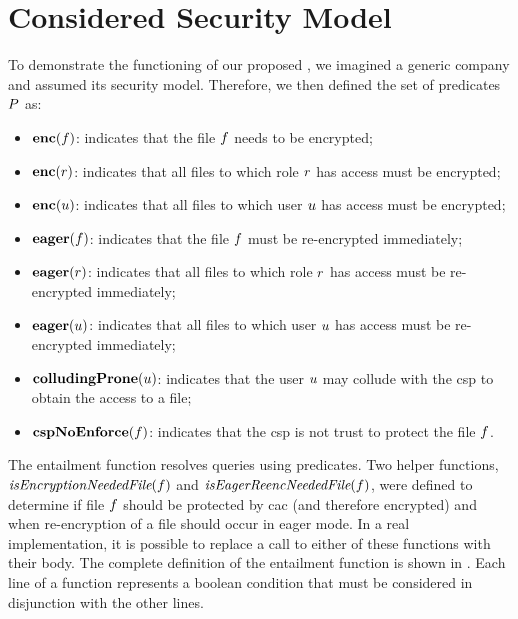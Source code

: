 \section{Considered Security Model}
\label{sec:hybird_istantiation}

To demonstrate the functioning of our proposed \erbacwhat, we imagined a generic company and assumed its security model. Therefore, we then defined the set of predicates \( P \) as:
\begin{itemize}
	\item \( \mathbf{enc}(f) \): indicates that the file \( f \) needs to be encrypted;
	\item \( \mathbf{enc}(r) \): indicates that all files to which role \( r \) has access must be encrypted;
	\item \( \mathbf{enc}(u) \): indicates that all files to which user \( u \) has access must be encrypted;
	\item \( \mathbf{eager}(f) \): indicates that the file \( f \) must be re-encrypted immediately;
	\item \( \mathbf{eager}(r) \): indicates that all files to which role \( r \) has access must be re-encrypted immediately;
	\item \( \mathbf{eager}(u) \): indicates that all files to which user \( u \) has access must be re-encrypted immediately;
	\item \( \mathbf{colludingProne}(u) \): indicates that the user \( u \) may collude with the \gls{csp} to obtain the access to a file;
	\item \( \mathbf{cspNoEnforce}(f) \): indicates that the \gls{csp} is not trust to protect the file \( f \).
\end{itemize}

The entailment function resolves queries using predicates. Two helper functions, \\ \( \textit{isEncryptionNeededFile}(f) \) and \( \textit{isEagerReencNeededFile}(f) \), were defined to determine if file \( f \) should be protected by \gls{cac} (and therefore encrypted) and when re-encryption of a file should occur in eager mode. In a real implementation, it is possible to replace a call to either of these functions with their body. The complete definition of the entailment function is shown in . Each line of a function represents a boolean condition that must be considered in disjunction with the other lines.

